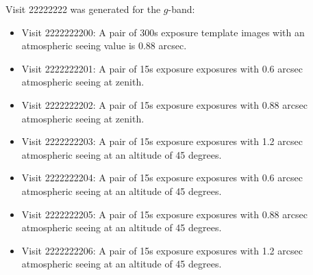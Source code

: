 \documentclass[prd, nofootinbib, floatfix, 11pt,tightenlines,times]{article}
\begin{document}
\begin{appendices}
Visit 22222222 was generated for the $g$-band:
 \begin{itemize}
\item Visit 2222222200: A pair of 300s exposure template images with
  an atmospheric seeing value is 0.88 arcsec.
\item Visit 2222222201: A pair of 15s exposure exposures with 0.6
arcsec atmospheric seeing at zenith.
\item Visit 2222222202: A pair of 15s exposure exposures with 0.88
arcsec atmospheric seeing at zenith.
\item Visit 2222222203: A pair of 15s exposure exposures with 1.2
arcsec atmospheric seeing at an altitude of 45 degrees.
\item Visit 2222222204: A pair of 15s exposure exposures with 0.6
arcsec atmospheric seeing at an altitude of 45 degrees.
\item Visit 2222222205: A pair of 15s exposure exposures with 0.88
arcsec atmospheric seeing at an altitude of 45 degrees.
\item Visit 2222222206: A pair of 15s exposure exposures with 1.2
arcsec atmospheric seeing at an altitude of 45 degrees.
\end{itemize}

\end{appendices}
\end{document}
